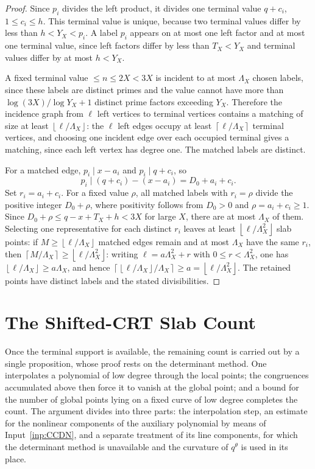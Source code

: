 \documentclass[11pt]{article}
\theoremstyle{definition}
\newcommand{\floor}[1]{\left\lfloor #1\right\rfloor}
\newcommand{\ceil}[1]{\left\lceil #1\right\rceil}
\newcommand{\1}{\mathbf 1}
\begin{document}
\begin{proof}
Since \(p_i\) divides the left product, it divides one terminal value
\(q+c_i\), \(1\le c_i\le h\).  This terminal value is unique, because two
terminal values differ by less than \(h<Y_X<p_i\).  A label \(p_i\) appears
on at most one left factor and at most one terminal value, since left factors
differ by less than \(T_X<Y_X\) and terminal values differ by at most \(h<Y_X\).

A fixed terminal value \(\le n\le2X<3X\) is incident to at most
\(\Lambda_X\) chosen labels, since these labels are distinct primes and the
value cannot have more than
\(\log(3X)/\log Y_X+1\) distinct prime factors exceeding \(Y_X\).  Therefore
the incidence graph from \(\ell\) left vertices to terminal vertices contains
a matching of size at least \(\floor{\ell/\Lambda_X}\): the \(\ell\) left
edges occupy at least \(\ceil{\ell/\Lambda_X}\) terminal vertices, and choosing
one incident edge over each occupied terminal gives a matching, since each
left vertex has degree one.  The matched labels are distinct.

For a matched edge, \(p_i\mid x-a_i\) and \(p_i\mid q+c_i\), so
\[
  p_i\mid(q+c_i)-(x-a_i)=D_0+a_i+c_i.
\]
Set \(r_i=a_i+c_i\).  For a fixed value \(\rho\), all matched labels with
\(r_i=\rho\) divide the positive integer \(D_0+\rho\), where positivity follows
from \(D_0>0\) and \(\rho=a_i+c_i\ge1\).  Since
\(D_0+\rho\le q-x+T_X+h<3X\) for large \(X\), there
are at most \(\Lambda_X\) of them.  Selecting one representative for each
distinct \(r_i\) leaves at least \(\floor{\ell/\Lambda_X^2}\) slab points:
if \(M\ge\floor{\ell/\Lambda_X}\) matched edges remain and at most
\(\Lambda_X\) have the same \(r_i\), then
\(\ceil{M/\Lambda_X}\ge\floor{\ell/\Lambda_X^2}\): writing
\(\ell=a\Lambda_X^2+r\) with \(0\le r<\Lambda_X^2\), one has
\(\floor{\ell/\Lambda_X}\ge a\Lambda_X\), and hence
\(\ceil{\floor{\ell/\Lambda_X}/\Lambda_X}\ge a=\floor{\ell/\Lambda_X^2}\).
The retained points have distinct labels and the stated divisibilities.
\end{proof}

\section{The Shifted-CRT Slab Count}\label{sec:slab}

Once the terminal support is available, the remaining count is carried out by
a single proposition, whose proof rests on the determinant method.  One
interpolates a polynomial of low degree through the local points; the
congruences accumulated above then force it to vanish at the global point;
and a bound for the number of global points lying on a fixed curve of low
degree completes the count.  The argument divides into three parts: the
interpolation step, an estimate for the nonlinear components of the auxiliary
polynomial by means of Input~\ref{inp:CCDN}, and a separate treatment of its
line components, for which the determinant method is unavailable and the
curvature of \(q^\theta\) is used in its place.
\end{document}
